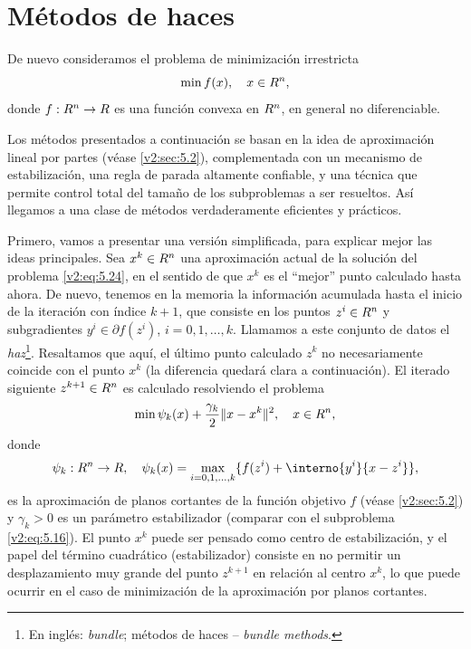 
\section{Métodos de haces}
\label{v2:sec:5.3}

De nuevo consideramos el problema de minimización irrestricta
\begin{equation}
    \min f(x), \quad x \in R^n,
    \label{v2:eq:5.24}
\end{equation}
donde $f : R^n \to R$ es una función convexa en $R^n$, en general no diferenciable.

Los métodos presentados a continuación se basan en la idea de aproximación lineal por partes (véase \cref{v2:sec:5.2}), complementada con un mecanismo de estabilización, una regla de parada altamente confiable, y una técnica que permite control total del tamaño de los subproblemas a ser resueltos. Así llegamos a una clase de métodos verdaderamente eficientes y prácticos.

Primero, vamos a presentar una versión simplificada, para explicar mejor las ideas principales. Sea $x^k \in R^n$ una aproximación actual de la solución del problema \eqref{v2:eq:5.24}, en el sentido de que $x^k$ es el ``mejor'' punto calculado hasta ahora. De nuevo, tenemos en la memoria la información acumulada hasta el inicio de la iteración con índice $k+1$, que consiste en los puntos $z^i \in R^n$ y subgradientes $y^i \in \partial f(z^i)$, $i = 0, 1, \dots, k$. Llamamos a este conjunto de datos el \textit{haz}\footnote{En inglés: \textit{bundle}; métodos de haces -- \textit{bundle methods}.}. Resaltamos que aquí, el último punto calculado $z^k$ no necesariamente coincide con el punto $x^k$ (la diferencia quedará clara a continuación). El iterado siguiente $z^{k+1} \in R^n$ es calculado resolviendo el problema
\begin{equation}
    \min \psi_k(x) + \frac{\gamma_k}{2} \lVert x - x^k\rVert^2, \quad x \in R^n,
    \label{v2:eq:5.25}
\end{equation}
donde
\begin{equation}
    \psi_k : \Rn \to \R, \quad \psi_k(x) = \max_{i=0, 1, \dots, k} \{ f(z^i) + \interno{y^i}{x - z^i} \},
    \label{v2:eq:5.26}
\end{equation}
es la aproximación de planos cortantes de la función objetivo $f$ (véase \cref{v2:sec:5.2}) y $\gamma_k > 0$ es un parámetro estabilizador (comparar con el subproblema \eqref{v2:eq:5.16}). El punto $x^k$ puede ser pensado como centro de estabilización, y el papel del término cuadrático (estabilizador) consiste en no permitir un desplazamiento muy grande del punto $z^{k+1}$ en relación al centro $x^k$, lo que puede ocurrir en el caso de minimización de la aproximación por planos cortantes. 

